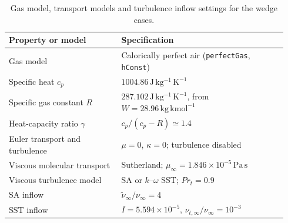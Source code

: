 \begin{table}[H]
    \centering
    \caption{Gas model, transport models and turbulence inflow settings for the wedge cases.}
    \label{tab:shock-gas-transport}
    \small
    \begin{tabular}{@{}p{0.38\linewidth}p{0.56\linewidth}@{}}
        \toprule
        Property or model & Specification \\
        \midrule
        Gas model & Calorically perfect air
            (\texttt{perfectGas}, \texttt{hConst}) \\
        Specific heat \(c_p\)
            & \(1004.86\,\mathrm{J\,kg^{-1}\,K^{-1}}\) \\
        Specific gas constant \(R\)
            & \(287.102\,\mathrm{J\,kg^{-1}\,K^{-1}}\),
              from \(W=28.96\,\mathrm{kg\,kmol^{-1}}\) \\
        Heat-capacity ratio \(\gamma\)
            & \(c_p/(c_p-R)\simeq1.4\) \\
        Euler transport and turbulence
            & \(\mu=0\), \(\kappa=0\); turbulence disabled \\
        Viscous molecular transport
            & Sutherland; \(\mu_\infty=1.846\times10^{-5}\,\mathrm{Pa\,s}\) \\
        Viscous turbulence model
            & SA or \(k\)--\(\omega\) SST; \(Pr_t=0.9\) \\
        SA inflow
            & \(\widetilde{\nu}_\infty/\nu_\infty=4\) \\
        SST inflow
            & \(I=5.594\times10^{-5}\),
              \(\nu_{t,\infty}/\nu_\infty=10^{-3}\) \\
        \bottomrule
    \end{tabular}
\end{table}

